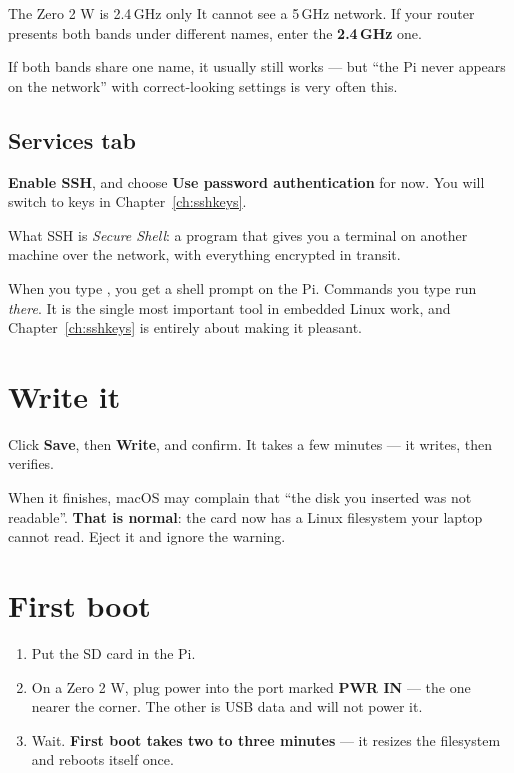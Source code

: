 \begin{trap}{The Zero 2 W is 2.4\,GHz only}
It cannot see a 5\,GHz network. If your router presents both bands under
different names, enter the \textbf{2.4\,GHz} one.

If both bands share one name, it usually still works --- but ``the Pi never
appears on the network'' with correct-looking settings is very often this.
\end{trap}

\subsection*{Services tab}

\textbf{Enable SSH}, and choose \textbf{Use password authentication} for now.
You will switch to keys in Chapter~\ref{ch:sshkeys}.

\begin{concept}{What SSH is}
\emph{Secure Shell}: a program that gives you a terminal on another machine over
the network, with everything encrypted in transit.

When you type , you get a shell prompt on the Pi.
Commands you type run \emph{there}. It is the single most important tool in
embedded Linux work, and Chapter~\ref{ch:sshkeys} is entirely about making it
pleasant.
\end{concept}

\section{Write it}

Click \textbf{Save}, then \textbf{Write}, and confirm. It takes a few minutes ---
it writes, then verifies.

When it finishes, macOS may complain that ``the disk you inserted was not
readable''. \textbf{That is normal}: the card now has a Linux filesystem your
laptop cannot read. Eject it and ignore the warning.

\section{First boot}

\begin{enumerate}
  \item Put the SD card in the Pi.
  \item On a Zero 2 W, plug power into the port marked \textbf{PWR IN} --- the
        one nearer the corner. The other is USB data and will not power it.
  \item Wait. \textbf{First boot takes two to three minutes} --- it resizes the
        filesystem and reboots itself once.
\end{enumerate}

